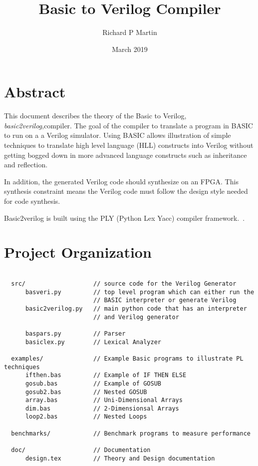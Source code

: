 \documentclass[10pt]{article}
\title{Basic to Verilog Compiler }
\author{Richard P Martin}
\date{March 2019}
\begin{document}
\maketitle

\section*{Abstract}

This document describes the theory of the Basic to Verilog, {\em basic2verilog},compiler. The goal of the compiler to translate a program in BASIC to run on a a Verilog simulator. Using BASIC allows illustration of simple techniques to translate high level language (HLL) constructs into Verilog without getting bogged down in more advanced language constructs such as inheritance and reflection.

In addition, the generated Verilog code should synthesize on an FPGA. This synthesis constraint means the Verilog code must follow the design style needed for code synthesis. 

Basic2verilog is built using the PLY (Python Lex Yacc) compiler framework.~\cite{ply}.

\section{Project Organization}

\begin{verbatim} 

  src/                   // source code for the Verilog Generator
      basveri.py         // top level program which can either run the 
                         // BASIC interpreter or generate Verilog
      basic2verilog.py   // main python code that has an interpreter 
                         // and Verilog generator

      baspars.py         // Parser 
      basiclex.py        // Lexical Analyzer                  

  examples/              // Example Basic programs to illustrate PL techniques 
      ifthen.bas         // Example of IF THEN ELSE
      gosub.bas          // Example of GOSUB 
      gosub2.bas         // Nested GOSUB
      array.bas          // Uni-Dimensional Arrays 
      dim.bas            // 2-Dimensionsal Arrays 
      loop2.bas          // Nested Loops 

  benchmarks/            // Benchmark programs to measure performance
    
  doc/                   // Documentation 
      design.tex         // Theory and Design documentation

\end{verbatim}
\end{document}
